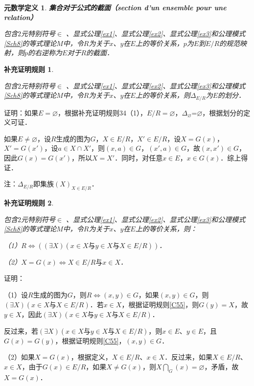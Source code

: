\documentclass[12pt, a4paper, oneside]{book}
\newtheorem{metadef}{元数学定义}
\newtheorem{Ccor}{补充证明规则}
\begin{document}
			\begin{metadef}
				\textbf{集合对于公式的截面（section d'un ensemble pour une relation）}
				\par
				包含$2$元特别符号$\in$ 、显式公理\ref{ex1}、显式公理\ref{ex2}、显式公理\ref{ex3}和公理模式\ref{Sch8}的等式理论$M$中，令$R$为关于$x$、$y$在$E$上的等价关系，$p$为$E$到$E/R$的规范映射，则$p$的右逆称为$E$对于$R$的截面．
			\end{metadef}

			\begin{Ccor}\label{Ccor37}
				\hfill\par
				包含$2$元特别符号$\in$ 、显式公理\ref{ex1}、显式公理\ref{ex2}、显式公理\ref{ex3}和公理模式\ref{Sch8}的等式理论$M$中，令$R$为关于$x$、$y$在$E$上的等价关系，则$\Delta_{E/R}$为$E$的划分．
			\end{Ccor}
			证明：如果$E=\varnothing$，根据补充证明规则34（1），$E/R=\varnothing$，$\Delta_{\varnothing}$=$\varnothing$，根据划分的定义可证．
			\par
			如果$E\neq \varnothing$，设$R$生成的图为$G$，$X\in E/R$，$X'\in E/R$，设$X=G(x)$，$X'=G(x')$，设$a\in X\cap X'$，则$(x, a)\in G$，$(x', a)\in G$，故$(x, x')\in G$，因此$G(x)= G(x')$，所以$X=X'$．同时，对任意$x\in E$，$x\in G(x)$．综上得证．
			\par
			注：$\Delta_{E/R}$即集族$(X)_{X\in E/R}$．

			\begin{Ccor}\label{Ccor38}
				\hfill\par
				包含$2$元特别符号$\in$ 、显式公理\ref{ex1}、显式公理\ref{ex2}、显式公理\ref{ex3}和公理模式\ref{Sch8}的等式理论$M$中，令$R$为关于$x$、$y$在$E$上的等价关系，则：
				\par
				（1）$R\Leftrightarrow ((\exists X)(x\in X\text{与}y\in X\text{与}X\in E/R))$．
				\par
				（2）$X=G(x)\Leftrightarrow X\in E/R\text{与}x\in X$．
			\end{Ccor}
			证明：
			\par
			（1）设$R$生成的图为$G$，则$R\Leftrightarrow (x, y)\in G$，如果$(x, y)\in G$，则$(\exists X)(x\in X\text{与}X\in E/R)$．若$x\in X$，根据证明规则\ref{C55}，则$G(y)=X$，故$y\in X$，因此$(\exists X)(x\in X\text{与}y\in X\text{与}X\in E/R)$．
			\par
			反过来，若$(\exists X)(x\in X\text{与}y\in X\text{与}X\in E/R)$，则$x\in E$、$y\in E$，且$G(x)=G(y)$，根据证明规则\ref{C55}，$(x, y)\in G$．
			\par
			（2）如果$X=G(x)$，根据定义，$X\in E/R$、$x\in X$．反过来，如果$X\in E/R$、$x\in X$，由于$G(x)\in E/R$，如果$X\neq G(x)$，则$X\bigcap\limits_G(x)=\varnothing$，矛盾，故$X=G(x)$．
\end{document}
